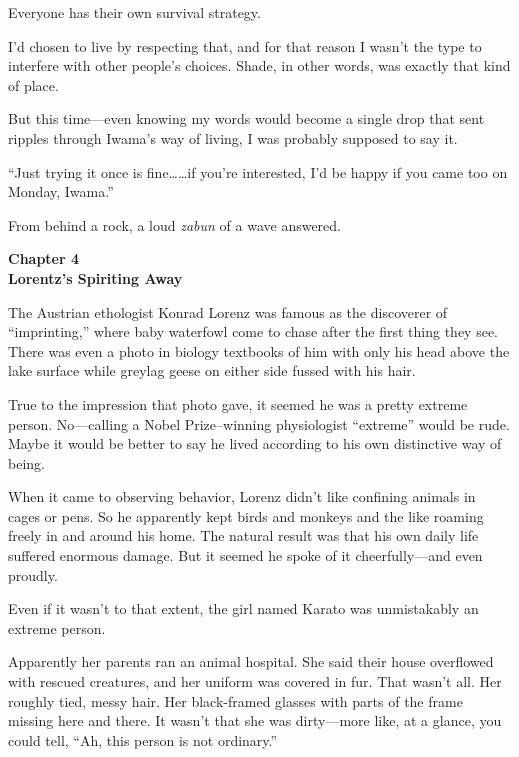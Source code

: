 \documentclass[
    a4paper,
    12pt,
    twoside,
    openany,
    UTF8,
    fontset=windows
]{ctexbook}
\begin{document}
Everyone has their own survival strategy.

I'd chosen to live by respecting that, and for that reason I wasn't the type to interfere with other people's choices. Shade, in other words, was exactly that kind of place.

But this time---even knowing my words would become a single drop that sent ripples through Iwama's way of living, I was probably supposed to say it.

``Just trying it once is fine\dots\dots if you're interested, I'd be happy if you came too on Monday, Iwama.''

From behind a rock, a loud \textit{zabun} of a wave answered.

\clearpage
\thispagestyle{plain}
\begin{center}
    \large\bfseries
    Chapter 4\\
    Lorentz's Spiriting Away
\end{center}
\label{sec:ch4}
\vspace{1cm}

The Austrian ethologist Konrad Lorenz was famous as the discoverer of ``imprinting,'' where baby waterfowl come to chase after the first thing they see. There was even a photo in biology textbooks of him with only his head above the lake surface while greylag geese on either side fussed with his hair.

True to the impression that photo gave, it seemed he was a pretty extreme person. No---calling a Nobel Prize--winning physiologist ``extreme'' would be rude. Maybe it would be better to say he lived according to his own distinctive way of being.

When it came to observing behavior, Lorenz didn't like confining animals in cages or pens. So he apparently kept birds and monkeys and the like roaming freely in and around his home. The natural result was that his own daily life suffered enormous damage. But it seemed he spoke of it cheerfully---and even proudly.

Even if it wasn't to that extent, the girl named Karato was unmistakably an extreme person.

Apparently her parents ran an animal hospital. She said their house overflowed with rescued creatures, and her uniform was covered in fur. That wasn't all. Her roughly tied, messy hair. Her black-framed glasses with parts of the frame missing here and there. It wasn't that she was dirty---more like, at a glance, you could tell, ``Ah, this person is not ordinary.''
\end{document}
